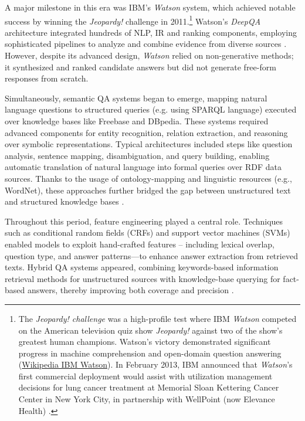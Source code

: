 \begin{spacing}{1.5}
A major milestone in this era was IBM's \textit{Watson} system, which achieved notable success by winning the \textit{Jeopardy!} challenge in 2011.\footnote{The \textit{Jeopardy! challenge} was a high-profile test where IBM \textit{Watson} competed on the American television quiz show \textit{Jeopardy!} against two of the show's greatest human champions. Watson’s victory demonstrated significant progress in machine comprehension and open-domain question answering (\href{https://en.wikipedia.org/w/index.php?title=IBM_Watson&oldid=1301611671}{Wikipedia IBM Watson}). In February 2013, IBM announced that \textit{Watson}'s first commercial deployment would assist with utilization management decisions for lung cancer treatment at Memorial Sloan Kettering Cancer Center in New York City, in partnership with WellPoint (now Elevance Health) \citep{upbin_ibms_2013}.} Watson’s \textit{DeepQA} architecture integrated hundreds of NLP, IR and ranking components, employing sophisticated pipelines to analyze and combine evidence from diverse sources \citep{ferrucci_building_2011}. However, despite its advanced design, \textit{Watson} relied on non-generative methods; it synthesized and ranked candidate answers but did not generate free-form responses from scratch.

Simultaneously, semantic QA systems began to emerge, mapping natural language questions to structured queries (e.g. using SPARQL language) executed over knowledge bases like Freebase and DBpedia. These systems required advanced components for entity recognition, relation extraction, and reasoning over symbolic representations. Typical architectures included steps like question analysis, sentence mapping, disambiguation, and query building, enabling automatic translation of natural language into formal queries over RDF data sources. Thanks to the usage of ontology-mapping and linguistic resources (e.g., WordNet), these approaches further bridged the gap between unstructured text and structured knowledge bases \citep{franco_ontology-based_2020}.

Throughout this period, feature engineering played a central role. Techniques such as conditional random fields (CRFs) and support vector machines (SVMs) enabled models to exploit hand-crafted features -- including lexical overlap, question type, and answer patterns—to enhance answer extraction from retrieved texts. Hybrid QA systems appeared, combining keywords-based information retrieval methods for unstructured sources with knowledge-base querying for fact-based answers, thereby improving both coverage and precision \citep{antoniou_survey_2022}.


\end{spacing}
